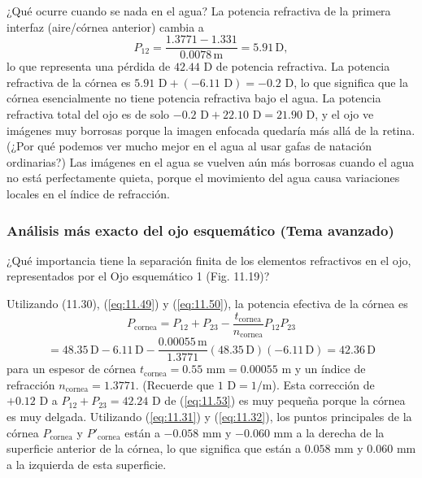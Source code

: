 \documentclass[12pt]{book}
\begin{document}
¿Qué ocurre cuando se nada en el agua? La potencia refractiva de la primera interfaz (aire/córnea anterior) cambia a
\begin{equation}
\label{eq:11.57}
P_{12} = \frac{1.3771 - 1.331}{0.0078\,\text{m}} = 5.91\,\text{D},
\end{equation}
lo que representa una pérdida de $42.44\text{ D}$ de potencia refractiva. La potencia refractiva de la córnea es $5.91\text{ D} + (-6.11\text{ D}) = -0.2\text{ D}$, lo que significa que la córnea esencialmente no tiene potencia refractiva bajo el agua. La potencia refractiva total del ojo es de solo $-0.2\text{ D} + 22.10\text{ D} = 21.90\text{ D}$, y el ojo ve imágenes muy borrosas porque la imagen enfocada quedaría más allá de la retina. (¿Por qué podemos ver mucho mejor en el agua al usar gafas de natación ordinarias?) Las imágenes en el agua se vuelven aún más borrosas cuando el agua no está perfectamente quieta, porque el movimiento del agua causa variaciones locales en el índice de refracción.

\subsubsection{Análisis más exacto del ojo esquemático (Tema avanzado)}

¿Qué importancia tiene la separación finita de los elementos refractivos en el ojo, representados por el Ojo esquemático 1 (Fig. 11.19)?

Utilizando (11.30), (\ref{eq:11.49}) y (\ref{eq:11.50}), la potencia efectiva de la córnea es
\begin{equation}
\label{eq:11.58}
P_{\text{cornea}} = P_{12} + P_{23} - \frac{t_{\text{cornea}}}{n_{\text{cornea}}} P_{12} P_{23}
\end{equation}
\begin{equation}
\label{eq:11.59}
= 48.35\,\text{D} - 6.11\,\text{D} - \frac{0.00055\,\text{m}}{1.3771} (48.35\,\text{D})(-6.11\,\text{D}) = 42.36\,\text{D}
\end{equation}
para un espesor de córnea $t_{\text{cornea}} = 0.55\text{ mm} = 0.00055\text{ m}$ y un índice de refracción $n_{\text{cornea}} = 1.3771$. (Recuerde que $1\text{ D} = 1/\text{m}$). Esta corrección de $+0.12\text{ D}$ a $P_{12} + P_{23} = 42.24\text{ D}$ de (\ref{eq:11.53}) es muy pequeña porque la córnea es muy delgada. Utilizando (\ref{eq:11.31}) y (\ref{eq:11.32}), los puntos principales de la córnea $P_{\text{cornea}}$ y $P'_{\text{cornea}}$ están a $-0.058\text{ mm}$ y $-0.060\text{ mm}$ a la derecha de la superficie anterior de la córnea, lo que significa que están a $0.058\text{ mm}$ y $0.060\text{ mm}$ a la izquierda de esta superficie.
\end{document}
